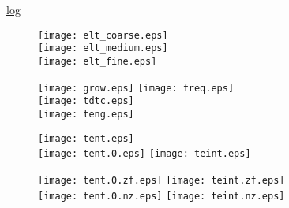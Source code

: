 \documentclass{article}
\begin{document}


\underline{log}\\


\newpage

\begin{figure}[!ht]
\texttt{[image: elt\_coarse.eps]}\\
\texttt{[image: elt\_medium.eps]}\\
\texttt{[image: elt\_fine.eps]}
\end{figure}

\begin{figure}[!ht]
\texttt{[image: grow.eps]}
\texttt{[image: freq.eps]}\\
\texttt{[image: tdtc.eps]}\\
\texttt{[image: teng.eps]}
\end{figure}

\begin{figure}[!ht]
\texttt{[image: tent.eps]}\\
\texttt{[image: tent.0.eps]}
\texttt{[image: teint.eps]}
\end{figure}

\begin{figure}[!ht]
\texttt{[image: tent.0.zf.eps]}
\texttt{[image: teint.zf.eps]}\\
\texttt{[image: tent.0.nz.eps]}
\texttt{[image: teint.nz.eps]}
\end{figure}
\end{document}
